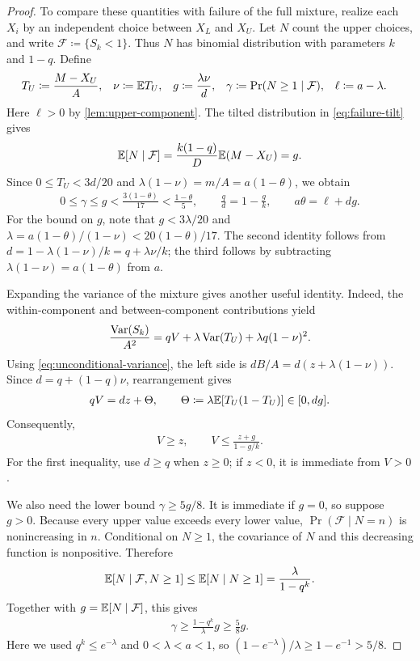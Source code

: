 \begin{proof}
To compare these quantities with failure of the full mixture, realize each $X_i$ by an independent choice between $X_L$ and $X_U$.
Let $N$ count the upper choices, and write $\mathcal F\coloneqq\{S_k<1\}$.
Thus $N$ has binomial distribution with parameters $k$ and $1-q$.
Define
\begin{align}
 T_U&\coloneqq\frac{M-X_U}{A},
 &\nu&\coloneqq\mathbb E T_U,
 &g&\coloneqq\frac{\lambda\nu}{d},
 &\gamma&\coloneqq\Pr(N\ge1\mid\mathcal F),
 &\ell&\coloneqq a-\lambda.
 \label{eq:upper-count-quantities}
\end{align}
Here $\ell>0$ by \cref{lem:upper-component}.
The tilted distribution in \cref{eq:failure-tilt} gives
\begin{align*}
 \mathbb E[N\mid\mathcal F]
 =\frac{k(1-q)}D\mathbb E(M-X_U)=g.
\end{align*}
Since $0\le T_U<3d/20$ and $\lambda(1-\nu)=m/A=a(1-\theta)$, we obtain
\begin{align}
 0\le\gamma\le g<\frac{3(1-\theta)}{17}<\frac{1-\theta}{5},
 \qquad \frac qd=1-\frac gk,
 \qquad a\theta=\ell+dg.
 \label{eq:upper-count-bounds}
\end{align}
For the bound on $g$, note that $g<3\lambda/20$ and
$\lambda=a(1-\theta)/(1-\nu)<20(1-\theta)/17$.
The second identity follows from
$d=1-\lambda(1-\nu)/k=q+\lambda\nu/k$; the third follows by subtracting $\lambda(1-\nu)=a(1-\theta)$ from $a$.

Expanding the variance of the mixture gives another useful identity.
Indeed, the within-component and between-component contributions yield
\begin{align*}
 \frac{\operatorname{Var}(S_k)}{A^2}
 =qV+\lambda\operatorname{Var}(T_U)+\lambda q(1-\nu)^2.
\end{align*}
Using \cref{eq:unconditional-variance}, the left side is $dB/A=d(z+\lambda(1-\nu))$.
Since $d=q+(1-q)\nu$, rearrangement gives
\begin{align}
 qV=dz+\Theta,
 \qquad
 \Theta\coloneqq\lambda\mathbb E[T_U(1-T_U)]\in[0,dg].
 \label{eq:lower-variance-identity}
\end{align}
Consequently,
\begin{align}
 V\ge z,
 \qquad
 V\le\frac{z+g}{1-g/k}.
 \label{eq:lower-variance-bounds}
\end{align}
For the first inequality, use $d\ge q$ when $z\ge0$; if $z<0$, it is immediate from $V>0$.

We also need the lower bound $\gamma\ge5g/8$.
It is immediate if $g=0$, so suppose $g>0$.
Because every upper value exceeds every lower value, $\Pr(\mathcal F\mid N=n)$ is nonincreasing in $n$.
Conditional on $N\ge1$, the covariance of $N$ and this decreasing function is nonpositive.
Therefore
\begin{align*}
 \mathbb E[N\mid\mathcal F,N\ge1]
 \le\mathbb E[N\mid N\ge1]=\frac{\lambda}{1-q^k}.
\end{align*}
Together with $g=\mathbb E[N\mid\mathcal F]$, this gives
\begin{align*}
 \gamma\ge\frac{1-q^k}{\lambda}g\ge\frac58g.
\end{align*}
Here we used $q^k\le e^{-\lambda}$ and $0<\lambda<a<1$, so
$(1-e^{-\lambda})/\lambda\ge1-e^{-1}>5/8$.


\end{proof}
